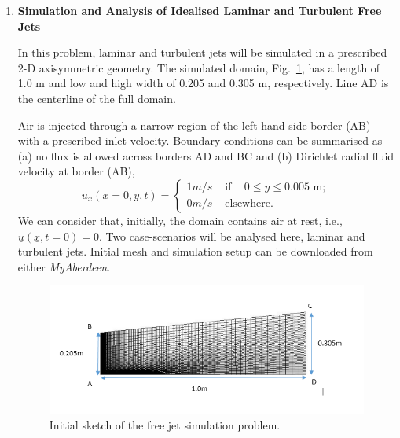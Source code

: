 \documentclass[12pts,a4paper,amsmath,amssymb,floatfix]{article}%
\renewcommand\leq{\leqslant}
\begin{document}
\begin{enumerate}[label=\bfseries Problem \arabic*:]
   \item\label{Problem1} {\bf Simulation and Analysis of Idealised Laminar and Turbulent Free Jets}

In this problem, laminar and turbulent jets will be simulated in a prescribed 2-D axisymmetric geometry. The simulated domain, Fig.~\ref{EG501V_Assignment:Sketch1}, has a length of 1.0 m and low and high width of 0.205 and 0.305 m, respectively. Line AD is the centerline of the full domain. 

          Air is injected through a narrow region of the left-hand side border (AB) with a prescribed inlet velocity. Boundary conditions can be summarised as (a) no flux is allowed across borders AD and BC and (b) Dirichlet radial fluid velocity at border (AB),
         \[ u_{x}( x=0, y, t) = \begin{cases}
             1 m/s & \text{ if } \;\;\;0\leq y\leq 0.005 \text{ m}; \\
             0 m/s & \text{ elsewhere.}
         \end{cases}\]  
         We can consider that, initially, the domain contains air at rest, i.e., $\underline{u}\left(\underline{x},t=0\right)=0$. Two case-scenarios will be analysed here, laminar and turbulent jets. Initial mesh and simulation setup can be downloaded from either {\it MyAberdeen}.


\begin{figure}[h]
\begin{center}
\includegraphics[width=15.cm,height=8.cm,clip]{./Pics/mesh.png}
\caption{Initial sketch of the free jet simulation problem. }
\label{EG501V_Assignment:Sketch1}
\end{center}
\end{figure}


\end{enumerate}
\end{document}
